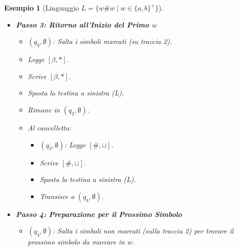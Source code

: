 \documentclass[a4paper, 11pt]{book} %
\newtheorem{example}[theorem]{Esempio}
\theoremstyle{definition}
\begin{document}
\begin{example}[Linguaggio $L = \{w\#w \mid w \in \{a,b\}^+\}$]
\begin{itemize}
\begin{itemize}
            \item Scrive $[\beta, *]$.
            \item Sposta la testina a destra (R).
            \item Rimane in $(q_2, \alpha)$.
            \item Quando trova il simbolo corrispondente a $\alpha$:
                \begin{itemize}
                    \item $(q_2, \alpha)$: Legge $[\alpha, \sqcup]$.
                    \item Scrive $[\alpha, *]$.
                    \item Sposta la testina a sinistra (L).
                    \item Transisce a $(q_3, \emptyset)$ (non serve più memorizzare $\alpha$).
                \end{itemize}
        \end{itemize}
    \item \textbf{Passo 3: Ritorno all'Inizio del Primo $w$}
        \begin{itemize}
            \item $(q_3, \emptyset)$: Salta i simboli marcati (su traccia 2).
            \item Legge $[\beta, *]$.
            \item Scrive $[\beta, *]$.
            \item Sposta la testina a sinistra (L).
            \item Rimane in $(q_3, \emptyset)$.
            \item Al cancelletto:
                \begin{itemize}
                    \item $(q_3, \emptyset)$: Legge $[\#, \sqcup]$.
                    \item Scrive $[\#, \sqcup]$.
                    \item Sposta la testina a sinistra (L).
                    \item Transisce a $(q_4, \emptyset)$.
                \end{itemize}
        \end{itemize}
    \item \textbf{Passo 4: Preparazione per il Prossimo Simbolo}
        \begin{itemize}
            \item $(q_4, \emptyset)$: Salta i simboli non marcati (sulla traccia 2) per trovare il prossimo simbolo da marcare in $w$.

\end{itemize}
\end{itemize}
\end{example}
\end{document}
